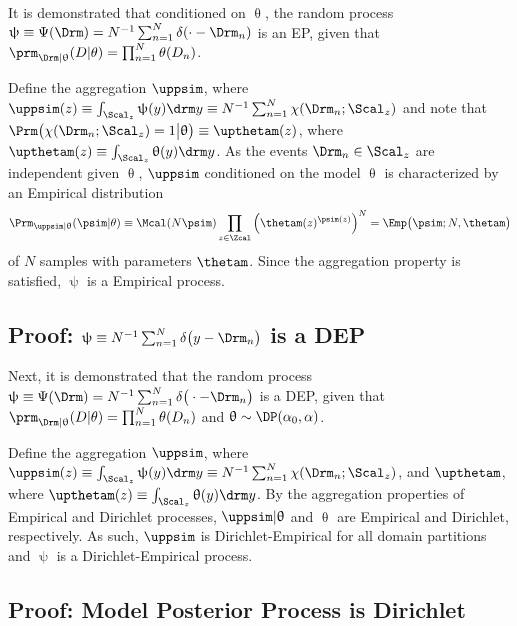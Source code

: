 \documentclass[12pt]{report}
\begin{document}
It is demonstrated that conditioned on $\uptheta$, the random process $\uppsi \equiv \Psi(\Drm) = N^{-1} \sum_{n=1}^N \delta(\cdot - \Drm_n)$ is an EP, given that $\prm_{\Drm|\uptheta}(D|\theta) = \prod_{n=1}^N \theta(D_n)$.

Define the aggregation $\uppsim$, where $\uppsim(z) \equiv \int_{\Scal_z} \uppsi(y) {\drm}y \equiv N^{-1} \sum_{n=1}^N \chi(\Drm_n;\Scal_z)$ and note that $\Prm\big( \chi(\Drm_n;\Scal_z) = 1 \big| \uptheta \big) \equiv \upthetam(z)$, where $\upthetam(z) \equiv \int_{\Scal_z} \uptheta(y) {\drm}y$. As the events $\Drm_n \in \Scal_z$ are independent given $\uptheta$, $\uppsim$ conditioned on the model $\uptheta$ is characterized by an Empirical distribution 
\begin{equation}
\Prm_{\uppsim | \uptheta}(\psim | \theta) \equiv \Mcal(N \psim) \prod_{z \in \Zcal} \left( \thetam(z) ^{\psim(z)} \right)^{N} = \Emp\big( \psim; N,\thetam \big)
\end{equation}
of $N$ samples with parameters $\thetam$. Since the aggregation property is satisfied, $\uppsi$ is a Empirical process.



\subsection{Proof: $\uppsi \equiv N^{-1} \sum_{n=1}^N \delta\big( y-\Drm_n \big)$ is a DEP}

Next, it is demonstrated that the random process $\uppsi \equiv \Psi(\Drm) = N^{-1} \sum_{n=1}^N \delta\big( \cdot-\Drm_n \big)$ is a DEP, given that $\prm_{\Drm|\uptheta}(D|\theta) = \prod_{n=1}^N \theta(D_n)$ and $\uptheta \sim \DP(\alpha_0, \alpha)$. 

Define the aggregation $\uppsim$, where $\uppsim(z) \equiv \int_{\Scal_z} \uppsi(y) {\drm}y \equiv N^{-1} \sum_{n=1}^N \chi(\Drm_n;\Scal_z)$, and $\upthetam$, where $\upthetam(z) \equiv \int_{\Scal_z} \uptheta(y) {\drm}y$. By the aggregation properties of Empirical and Dirichlet processes, $\uppsim | \uptheta$ and $\uptheta$ are Empirical and Dirichlet, respectively. As such, $\uppsim$ is Dirichlet-Empirical for all domain partitions and $\uppsi$ is a Dirichlet-Empirical process.





\subsection{Proof: Model Posterior Process is Dirichlet} \label{app:DP_post}
\end{document}
